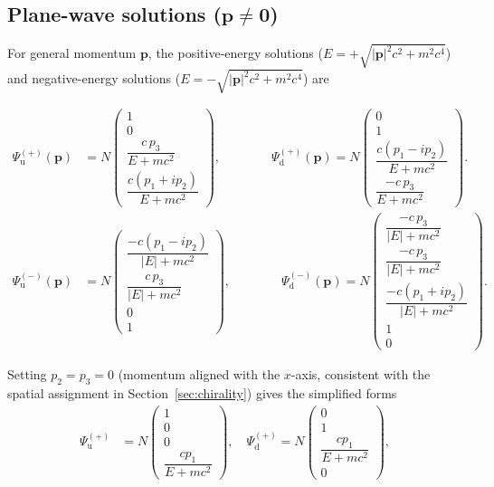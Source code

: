 \documentclass[%
 reprint, amsmath,amssymb, aps, prb, ]{revtex4-2}
\numberwithin{equation}{section}
\begin{document}
\subsection{Plane-wave solutions ($\mathbf{p}\neq\mathbf{0}$)}
\label{app:planewave}

For general momentum $\mathbf{p}$, the positive-energy solutions ($E=+\sqrt{|\mathbf{p}|^2c^2+m^2c^4}$) and negative-energy solutions ($E=-\sqrt{|\mathbf{p}|^2c^2+m^2c^4}$) are~\cite{Griffiths}
\begin{widetext}
\begin{align}
\Psi^{(+)}_{\mathrm{u}}(\mathbf{p})
&= N\begin{pmatrix}
1 \\[2pt] 0 \\[4pt]
\dfrac{c\,p_3}{E+mc^2} \\[8pt]
\dfrac{c(p_1+ip_2)}{E+mc^2}
\end{pmatrix},\qquad\qquad
\Psi^{(+)}_{\mathrm{d}}(\mathbf{p})
= N\begin{pmatrix}
0 \\[2pt] 1 \\[4pt]
\dfrac{c(p_1-ip_2)}{E+mc^2} \\[8pt]
\dfrac{-c\,p_3}{E+mc^2}
\end{pmatrix}.
\label{eq:positive_pw}
\end{align}
\begin{align}
\Psi^{(-)}_{\mathrm{u}}(\mathbf{p})
&= N\begin{pmatrix}
\dfrac{-c(p_1-ip_2)}{|E|+mc^2} \\[8pt]
\dfrac{c\,p_3}{|E|+mc^2} \\[4pt]
0 \\[2pt] 1
\end{pmatrix},\qquad\qquad
\Psi^{(-)}_{\mathrm{d}}(\mathbf{p})
= N\begin{pmatrix}
\dfrac{-c\,p_3}{|E|+mc^2} \\[8pt]
\dfrac{-c\,p_3}{|E|+mc^2} \\[8pt]
\dfrac{-c(p_1+ip_2)}{|E|+mc^2} \\[8pt]
1 \\[2pt] 0
\end{pmatrix}.
\label{eq:negative_pw}
\end{align}
\end{widetext}
Setting $p_2=p_3=0$ (momentum aligned with the $x$-axis, consistent with the spatial assignment in Section~\ref{sec:chirality}) gives the simplified forms
\begin{align}
\Psi^{(+)}_{\mathrm{u}}&= N\!\begin{pmatrix}1\\0\\0\\\dfrac{cp_1}{E+mc^2}\end{pmatrix},\quad
\Psi^{(+)}_{\mathrm{d}}= N\!\begin{pmatrix}0\\1\\\dfrac{cp_1}{E+mc^2}\\0\end{pmatrix},
\label{eq:pos_simplified}
\end{align}
\end{document}
